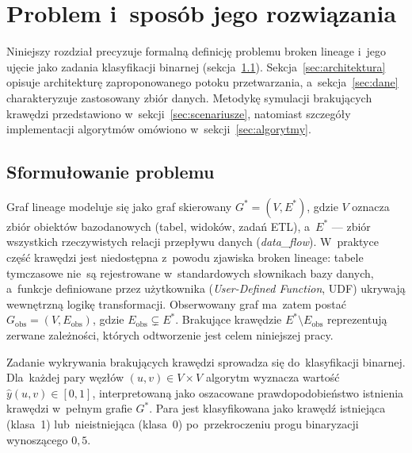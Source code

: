 
\chapter{Problem i~sposób jego rozwiązania}

Niniejszy rozdział precyzuje formalną definicję problemu broken lineage
i~jego ujęcie jako zadania klasyfikacji binarnej (sekcja~\ref{sec:sformulowanie}).
Sekcja~\ref{sec:architektura} opisuje architekturę zaproponowanego
potoku przetwarzania, a~sekcja~\ref{sec:dane} charakteryzuje zastosowany
zbiór danych. Metodykę symulacji brakujących krawędzi przedstawiono
w~sekcji~\ref{sec:scenariusze}, natomiast szczegóły implementacji
algorytmów omówiono w~sekcji~\ref{sec:algorytmy}.

\section{Sformułowanie problemu}
\label{sec:sformulowanie}

Graf lineage modeluje się jako graf skierowany $G^{*} = (V, E^{*})$,
gdzie $V$ oznacza zbiór obiektów bazodanowych (tabel, widoków, zadań ETL),
a~$E^{*}$ — zbiór wszystkich rzeczywistych relacji przepływu danych
(\emph{data\_flow}). W~praktyce część krawędzi jest niedostępna
z~powodu zjawiska broken lineage: tabele tymczasowe nie~są rejestrowane
w~standardowych słownikach bazy danych, a~funkcje definiowane przez
użytkownika (\emph{User-Defined Function}, UDF) ukrywają wewnętrzną
logikę transformacji. Obserwowany graf ma~zatem postać
$G_{\mathrm{obs}} = (V, E_{\mathrm{obs}})$, gdzie
$E_{\mathrm{obs}} \subsetneq E^{*}$. Brakujące krawędzie
$E^{*} \setminus E_{\mathrm{obs}}$ reprezentują zerwane zależności,
których odtworzenie jest celem niniejszej pracy.

Zadanie wykrywania brakujących krawędzi sprowadza się do~klasyfikacji
binarnej. Dla~każdej pary węzłów $(u, v) \in V \times V$ algorytm
wyznacza wartość $\hat{y}(u, v) \in [0, 1]$, interpretowaną jako
oszacowane prawdopodobieństwo istnienia krawędzi w~pełnym grafie
$G^{*}$. Para jest klasyfikowana jako krawędź istniejąca (klasa~1)
lub~nieistniejąca (klasa~0) po~przekroczeniu progu binaryzacji
wynoszącego $0{,}5$.

